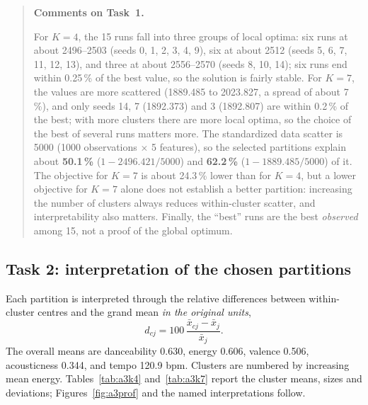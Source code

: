 \documentclass[11pt,letterpaper]{article}
\newenvironment{taskcomments}[1][Comments]{%
  \par\medskip\noindent
  \begin{quote}\small\textbf{#1.}\enspace\ignorespaces
}{%
  \end{quote}\medskip
}
\begin{document}
\begin{taskcomments}[Comments on Task~1]
For $K=4$, the 15 runs fall into three groups of local optima: six runs at
about 2496--2503 (seeds 0, 1, 2, 3, 4, 9), six at about 2512 (seeds 5, 6, 7,
11, 12, 13), and three at about 2556--2570 (seeds 8, 10, 14); six runs end
within 0.25\,\% of the best value, so the solution is fairly stable. For
$K=7$, the values are more scattered (1889.485 to 2023.827, a spread of about
7\,\%), and only seeds 14, 7 (1892.373) and 3 (1892.807) are within 0.2\,\%
of the best; with more clusters there are more local optima, so the choice of
the best of several runs matters more. The standardized data scatter is 5000
(1000 observations $\times$ 5 features), so the selected partitions explain
about \textbf{50.1\,\%} ($1 - 2496.421/5000$) and \textbf{62.2\,\%} ($1 -
1889.485/5000$) of it. The objective for $K=7$ is about 24.3\,\% lower than
for $K=4$, but a lower objective for $K=7$ alone does not establish a better
partition: increasing the number of clusters always reduces within-cluster
scatter, and interpretability also matters. Finally, the ``best'' runs are
the best \emph{observed} among 15, not a proof of the global optimum.
\end{taskcomments}

\subsection{Task 2: interpretation of the chosen partitions}\label{sec:a3t2}

Each partition is interpreted through the relative differences between
within-cluster centres and the grand mean \emph{in the original units},
\begin{equation}
  d_{cj} = 100\,\frac{\bar{x}_{cj} - \bar{x}_j}{\bar{x}_j}.
\end{equation}
The overall means are danceability 0.630, energy 0.606, valence 0.506,
acousticness 0.344, and tempo 120.9 bpm. Clusters are numbered by increasing
mean energy. Tables~\ref{tab:a3k4} and~\ref{tab:a3k7} report the cluster
means, sizes and deviations; Figures~\ref{fig:a3prof} and the named
interpretations follow.
\end{document}
